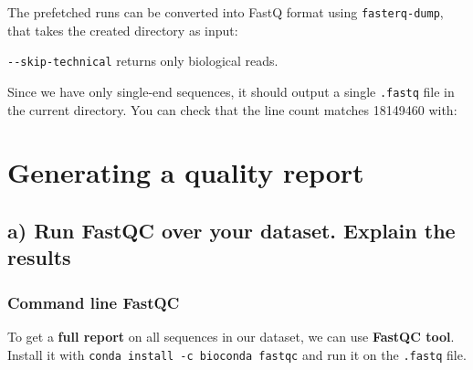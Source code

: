 The prefetched runs can be converted into FastQ format using
\texttt{fasterq-dump}, that takes the created directory as input:

\begin{Shaded}
\begin{Highlighting}[]
 
\end{Highlighting}
\end{Shaded}

\texttt{-\/-skip-technical} returns only biological reads.

Since we have only single-end sequences, it should output a single
\texttt{.fastq} file in the current directory. You can check that the
line count matches 18149460 with:

\begin{Shaded}
\begin{Highlighting}[]
 
\end{Highlighting}
\end{Shaded}

\hypertarget{generating-a-quality-report}{%
\section{Generating a quality
report}\label{generating-a-quality-report}}

\hypertarget{a-run-fastqc-over-your-dataset.-explain-the-results}{%
\subsection{a) Run FastQC over your dataset. Explain the
results}\label{a-run-fastqc-over-your-dataset.-explain-the-results}}

\hypertarget{command-line-fastqc}{%
\subsubsection{Command line FastQC}\label{command-line-fastqc}}

To get a \textbf{full report} on all sequences in our dataset, we can
use \textbf{FastQC tool}. Install it with
\texttt{conda\ install\ -c\ bioconda\ fastqc} and run it on the
\texttt{.fastq} file.

\begin{Shaded}
\begin{Highlighting}[]
\end{Highlighting}
\end{Shaded}

